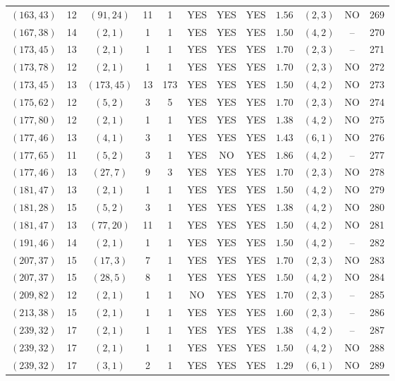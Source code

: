 \begin{longtable}{|c|c|c|c|c|c|c|c|c|c|c|c|}
$(163,43)$ & 12 & $(91,24)$ & 11 & 1 & YES & YES & YES & $1.56$ & $(2,3)$ & NO & 269\\
$(167,38)$ & 14 & $(2,1)$ & 1 & 1 & YES & YES & YES & $1.50$ & $(4,2)$ & -- & 270\\
$(173,45)$ & 13 & $(2,1)$ & 1 & 1 & YES & YES & YES & $1.70$ & $(2,3)$ & -- & 271\\
$(173,78)$ & 12 & $(2,1)$ & 1 & 1 & YES & YES & YES & $1.70$ & $(2,3)$ & NO & 272\\
$(173,45)$ & 13 & $(173,45)$ & 13 & 173 & YES & YES & YES & $1.50$ & $(4,2)$ & NO & 273\\
$(175,62)$ & 12 & $(5,2)$ & 3 & 5 & YES & YES & YES & $1.70$ & $(2,3)$ & NO & 274\\
$(177,80)$ & 12 & $(2,1)$ & 1 & 1 & YES & YES & YES & $1.38$ & $(4,2)$ & NO & 275\\
$(177,46)$ & 13 & $(4,1)$ & 3 & 1 & YES & YES & YES & $1.43$ & $(6,1)$ & NO & 276\\
$(177,65)$ & 11 & $(5,2)$ & 3 & 1 & YES & NO & YES & $1.86$ & $(4,2)$ & -- & 277\\
$(177,46)$ & 13 & $(27,7)$ & 9 & 3 & YES & YES & YES & $1.70$ & $(2,3)$ & NO & 278\\
$(181,47)$ & 13 & $(2,1)$ & 1 & 1 & YES & YES & YES & $1.50$ & $(4,2)$ & NO & 279\\
$(181,28)$ & 15 & $(5,2)$ & 3 & 1 & YES & YES & YES & $1.38$ & $(4,2)$ & NO & 280\\
$(181,47)$ & 13 & $(77,20)$ & 11 & 1 & YES & YES & YES & $1.50$ & $(4,2)$ & NO & 281\\
$(191,46)$ & 14 & $(2,1)$ & 1 & 1 & YES & YES & YES & $1.50$ & $(4,2)$ & -- & 282\\
$(207,37)$ & 15 & $(17,3)$ & 7 & 1 & YES & YES & YES & $1.70$ & $(2,3)$ & NO & 283\\
$(207,37)$ & 15 & $(28,5)$ & 8 & 1 & YES & YES & YES & $1.50$ & $(4,2)$ & NO & 284\\
$(209,82)$ & 12 & $(2,1)$ & 1 & 1 & NO & YES & YES & $1.70$ & $(2,3)$ & -- & 285\\
$(213,38)$ & 15 & $(2,1)$ & 1 & 1 & YES & YES & YES & $1.60$ & $(2,3)$ & -- & 286\\
$(239,32)$ & 17 & $(2,1)$ & 1 & 1 & YES & YES & YES & $1.38$ & $(4,2)$ & -- & 287\\
$(239,32)$ & 17 & $(2,1)$ & 1 & 1 & YES & YES & YES & $1.50$ & $(4,2)$ & NO & 288\\
$(239,32)$ & 17 & $(3,1)$ & 2 & 1 & YES & YES & YES & $1.29$ & $(6,1)$ & NO & 289\\

\end{longtable}
